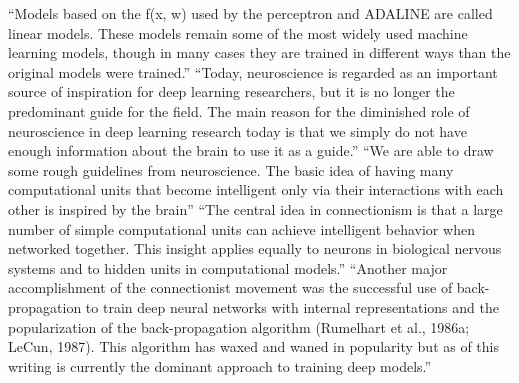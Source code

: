 \documentclass{automatextcc}
\begin{document}
``Models based on the f(x, w) used by the perceptron and ADALINE are called linear models. These models remain some of the most widely used machine learning models, though in many cases they are trained in different ways than the original models were trained.''
``Today, neuroscience is regarded as an important source of inspiration for deep learning researchers, but it is no longer the predominant guide for the field. The main reason for the diminished role of neuroscience in deep learning research today is that we simply do not have enough information about the brain to use it as a guide.''
``We are able to draw some rough guidelines from neuroscience. The basic idea of having many computational units that become intelligent only via their interactions with each other is inspired by the brain''
``The central idea in connectionism is that a large number of simple computational units can achieve intelligent behavior when networked together. This insight applies equally to neurons in biological nervous systems and to hidden units in computational models.''
``Another major accomplishment of the connectionist movement was the successful use of back-propagation to train deep neural networks with internal representations and the popularization of the back-propagation algorithm (Rumelhart et al., 1986a; LeCun, 1987). This algorithm has waxed and waned in popularity but as of this writing is currently the dominant approach to training deep models.''
\end{document}
